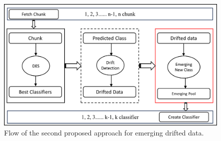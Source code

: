 \begin{figure}[ht]
	\centering
	\includegraphics[width=1\linewidth]{5_Emerging/images/pro1.png}
	\caption{Flow of the second proposed approach for emerging drifted
	data.}
	\label{fig:proposal_step_1}
\end{figure}

